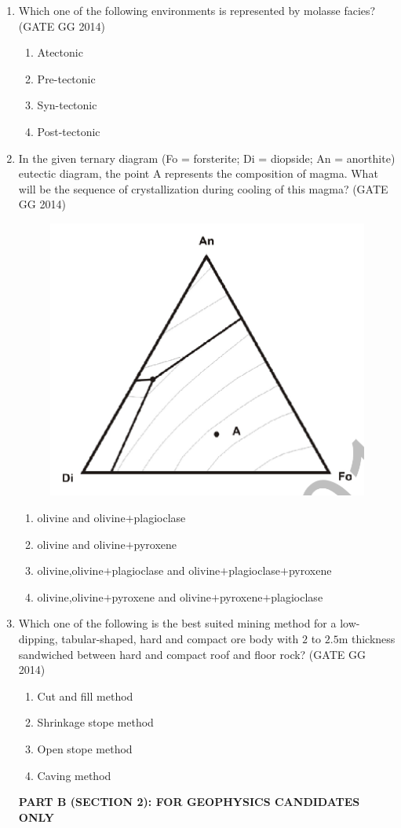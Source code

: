 \documentclass[journal]{IEEEtran}
\begin{document}
\begin{enumerate}[start=1]
\item Which one of the following environments is represented by molasse facies?
\hfill(GATE GG 2014)\begin{multicols}{2} 
\begin{enumerate}
    \item Atectonic
    \item Pre-tectonic
    \item Syn-tectonic
    \item Post-tectonic
\end{enumerate}
\end{multicols}

\item In the given ternary diagram (Fo = forsterite; Di = diopside; An = anorthite) eutectic diagram, the point A represents the composition of magma.  
What will be the sequence of crystallization during cooling of this magma?
\hfill(GATE GG 2014)
\begin{figure}[H]
    \centering
    \includegraphics[width=0.5\columnwidth]{figs/08.png} 
    \caption{}
    \label{fig:48}
\end{figure}
\begin{enumerate}
    \item olivine and olivine$+$plagioclase
    \item olivine and olivine$+$pyroxene
    \item olivine,olivine$+$plagioclase and olivine$+$plagioclase$+$pyroxene
    \item olivine,olivine$+$pyroxene and olivine$+$pyroxene$+$plagioclase
\end{enumerate}

\item Which one of the following is the best suited mining method for a low-dipping, tabular-shaped, hard and compact ore body with $2$ to $2.5$m thickness sandwiched between hard and compact roof and floor rock?
\hfill(GATE GG 2014)
\begin{multicols}{2}
    \begin{enumerate}
    \item Cut and fill method
    \item Shrinkage stope method
    \item Open stope method
    \item Caving method
\end{enumerate}
\end{multicols}
\vspace{0.6cm}
\textbf{PART B (SECTION 2): FOR GEOPHYSICS  CANDIDATES ONLY}
\end{enumerate}
\end{document}
